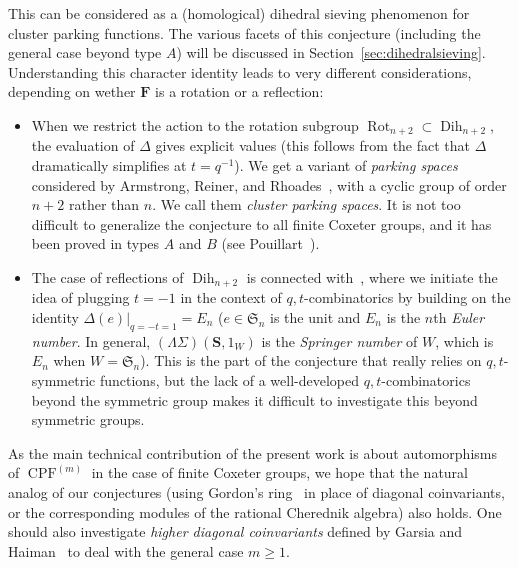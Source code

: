 \documentclass[11pt]{article}
\theoremstyle{definition}
\DeclareMathOperator{\dih}{Dih}
\DeclareMathOperator{\rot}{Rot}
\newcommand{\RR}{\mathcal{R}}
\newcommand{\FFF}{\mathbf{F}}
\newcommand{\SSS}{\mathbf{S}}
\DeclareMathOperator{\CPF}{CPF}
\begin{document}
This can be considered as a (homological) dihedral sieving phenomenon for cluster parking functions.  The various facets of this conjecture (including the general case beyond type $A$) will be discussed in Section~\ref{sec:dihedralsieving}.  Understanding this character identity leads to very different considerations, depending on wether $\FFF$ is a rotation or a reflection:
\begin{itemize}
    \item When we restrict the action to the rotation subgroup $\rot_{n+2} \subset \dih_{n+2}$, the evaluation of $\Delta$ gives explicit values (this follows from the fact that $\varDelta$ dramatically simplifies at $t = q^{-1}$).
    We get a variant of {\it parking spaces} considered by Armstrong, Reiner, and Rhoades~\cite{armstrongreinerrhoades}, with a cyclic group of order $n+2$ rather than $n$.   We call them {\it cluster parking spaces}.  It is not too difficult to generalize the conjecture to all finite Coxeter groups, and it has been proved in types $A$ and $B$ (see Pouillart~\cite{pouillart2}).
    \item The case of reflections of $\dih_{n+2}$ is connected with~\cite{corteeljosuatvergesvandenwyngaerd}, where we initiate the idea of plugging $t=-1$ in the context of $q,t$-combinatorics by building on the identity $\varDelta(e)\big\vert_{q=-t=1} = E_n$ ($e\in\mathfrak{S}_n$ is the unit and $E_n$ is the $n$th {\it Euler number}. In general, $(\Lambda\Sigma)(\SSS,1_W)$ is the {\it Springer number} of $W$, which is $E_n$ when $W = \mathfrak{S}_n$). This is the part of the conjecture that really relies on $q,t$-symmetric functions, but the lack of a well-developed $q,t$-combinatorics beyond the symmetric group makes it difficult to investigate this beyond symmetric groups.
\end{itemize}

As the main technical contribution of the present work is about automorphisms of $\CPF^{(m)}$ in the case of finite Coxeter groups, we hope that the natural analog of our conjectures (using Gordon's ring~\cite{gordon} in place of diagonal coinvariants, or the corresponding modules of the rational Cherednik algebra) also holds.   One should also investigate {\it higher diagonal coinvariants} defined by Garsia and Haiman~\cite[Section~5]{garsiahaiman} to deal with the general case $m\geq1$.



\end{document}
